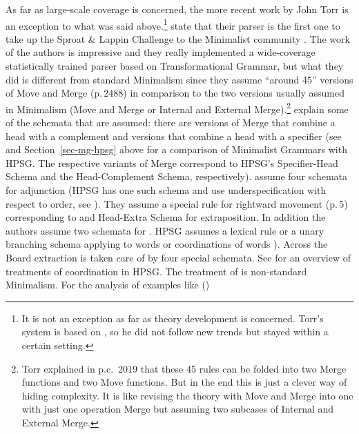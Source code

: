 As\label{page-torr-implementation-beginning} far as large-scale coverage is concerned, the more recent work by John Torr is an
exception to what was said above.\footnote{%
  It is not an exception as far as theory development is concerned. Torr's system is based on
  , so he did not follow new trends but stayed within a certain setting.
} \citet*{TSSC2019a} state that their parser is the first one to take up the Sproat 
\& Lappin Challenge to the Minimalist community \citeyearpar{SL2005a}. The work of the authors is
impressive and they really implemented a wide-coverage statistically trained parser based on
Transformational Grammar, but what they did is different from standard Minimalism since they assume
``around 45'' versions of Move and Merge (p.\,2488) in comparison to the two versions usually
assumed in Minimalism (Move and Merge or Internal and External Merge).\footnote{%
 Torr explained in p.c.\ 2019 that these 45 rules can be folded into two Merge functions and two Move
 functions. But in the end this is just a clever way of hiding complexity. It is like \citet[]{Chomsky2005a}
 revising the theory with Move and Merge into one with just one operation Merge but assuming two
 subcases of Internal and External Merge.
} \citet{TS2016a} explain some of the schemata that are assumed: there are versions of Merge that
combine a head with a complement and versions that combine a head with a specifier (see
\citet{MuellerUnifying} and Section~\ref{sec-mg-hpsg} above for a comparison of Minimalist Grammars
with HPSG. The respective variants of Merge correspond to HPSG's Specifier-Head Schema and the Head-Complement Schema,
respectively). \citet[]{TS2016a} assume four schemata for adjunction (HPSG has one such schema and use
underspecification with respect to order, see ). They assume a special rule
for rightward movement (p.\,5) corresponding to  and  Head-Extra
Schema for extraposition. In addition the authors assume two schemata for . HPSG
assumes a lexical rule or a unary branching schema applying to words or coordinations of words
\parencites{MuellerGS}[Section~5.1]{MuellerOrder}). Across the Board extraction \citep{Ross67a} is taken care of by
four special schemata. See \citet{AC2021a} for an overview of treatments of coordination in
HPSG. The treatment of  is non-standard Minimalism. For the analysis of examples like ()
